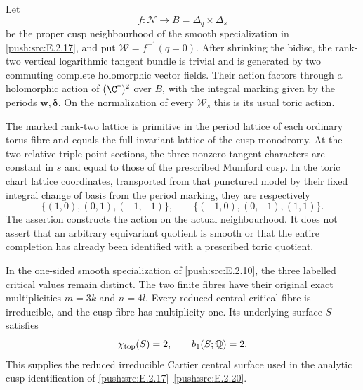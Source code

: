 
\begin{proposition}\hypertarget{tag-0334}{}\label{push:src:E.2.19}


Let
\[
 f:\mathcal N\longrightarrow
 B=\Delta_q\times\Delta_s
\]
be the proper cusp neighbourhood of the smooth
specialization in \ref{push:src:E.2.17}, and put
$\mathcal W=f^{-1}(q=0)$.  After shrinking the
bidisc, the rank-two vertical logarithmic tangent
bundle is trivial and is generated by two commuting
complete holomorphic vector fields.  Their action
factors through a holomorphic action of
$(\C^*)^2$ over $B$, with the integral marking
given by the periods $\mathbf w,\boldsymbol\delta$.
On the normalization of every $\mathcal W_s$
this is its usual toric action.

The marked rank-two lattice is primitive in the
period lattice of each ordinary torus fibre and
equals the full invariant lattice of the cusp
monodromy.  At the two relative triple-point
sections, the three nonzero tangent characters
are constant in $s$ and equal to those of the
prescribed Mumford cusp.  In the toric chart
lattice coordinates, transported from that
punctured model by their fixed integral change
of basis from the period marking, they are
respectively
\[
 \{(1,0),(0,1),(-1,-1)\},\qquad
 \{(-1,0),(0,-1),(1,1)\}.
 \tag{E.2.19.1}
\]
The assertion constructs the action on the actual
neighbourhood.  It does not assert that an
arbitrary equivariant quotient is smooth or
that the entire completion has already been
identified with a prescribed toric quotient.
\end{proposition}

\begin{proposition}\hypertarget{tag-0331}{}\label{push:src:E.2.16}


In the one-sided smooth specialization of \ref{push:src:E.2.10},
the three labelled critical values remain distinct.
The two finite fibres have their original exact
multiplicities $m=3k$ and $n=4l$.  Every reduced
central critical fibre is irreducible, and the
cusp fibre has multiplicity one.  Its underlying
surface $S$ satisfies
\[
 \chi_{\rm top}(S)=2,\qquad b_1(S;\mathbb Q)=2.
\]
This supplies the reduced irreducible Cartier central
surface used in the analytic cusp identification of
\ref{push:src:E.2.17}--\ref{push:src:E.2.20}.
\end{proposition}

